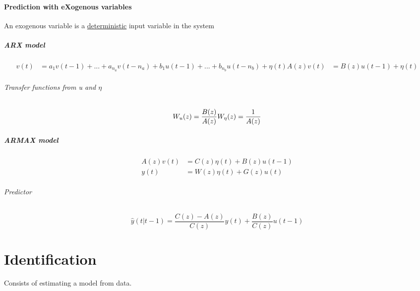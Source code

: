 \documentclass{article}
\let\OldPart\part
\renewcommand{\part}{\newpage\OldPart}
\begin{document}
\subsection{Prediction with eXogenous variables}
An exogenous variable is a \underline{deterministic} input variable in the system
\subsubsection{ARX model}
\begin{align*}
v(t)&=a_1v(t-1)+...+a_{n_a}v(t-n_a)+b_1u(t-1)+...+b_{n_b}u(t-n_b)+\eta(t)
A(z)v(t)&=B(z)u(t-1)+\eta(t)
\end{align*}
\paragraph{Transfer functions from u and $\eta$}
\[
W_u(z)=\frac{B(z)}{A(z)}\\
W_{\eta}(z)=\frac{1}{A(z)}
\]
\subsubsection{ARMAX model}
\begin{align*}
A(z)v(t)&=C(z)\eta(t)+B(z)u(t-1)\\
y(t)&=W(z)\eta(t)+G(z)u(t)
\end{align*}
\paragraph{Predictor}
\[
\hat{y}(t|t-1)=
\frac{C(z)-A(z)}{C(z)}y(t)
+\frac{B(z)}{C(z)}u(t-1)
\]

\newpage
\part{Identification}
Consists of estimating a model from data.
\end{document}
